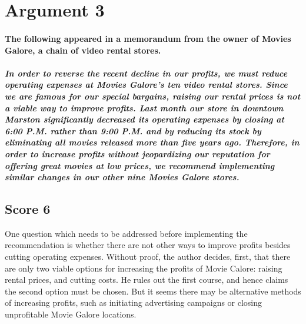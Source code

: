 \section{Argument 3}

\paragraph{The following appeared in a memorandum from the owner of Movies Galore, a chain of video rental stores.}
\subparagraph{In order to reverse the recent decline in our profits, we must reduce operating expenses at Movies Galore's ten video rental stores.
Since we are famous for our special bargains, raising our rental prices is not a viable way to improve profits.
Last month our store in downtown Marston significantly decreased its operating expenses by closing at 6:00 P.M. rather than 9:00 P.M. and by reducing its stock by eliminating all movies released more than five years ago.
Therefore, in order to increase profits without jeopardizing our reputation for offering great movies at low prices, we recommend implementing similar changes in our other nine Movies Galore stores.}

\subsection{Score 6}
One question which needs to be addressed before implementing the recommendation is whether there are not other ways to improve profits besides cutting operating expenses.
Without proof, the author decides, first, that there are only two viable options for increasing the profits of Movie Calore: raising rental prices, and cutting costs.
He rules out the first course, and hence claims the second option must be chosen.
But it seems there may be alternative methods of increasing profits, such as initiating advertising campaigns or closing unprofitable Movie Galore locations.

